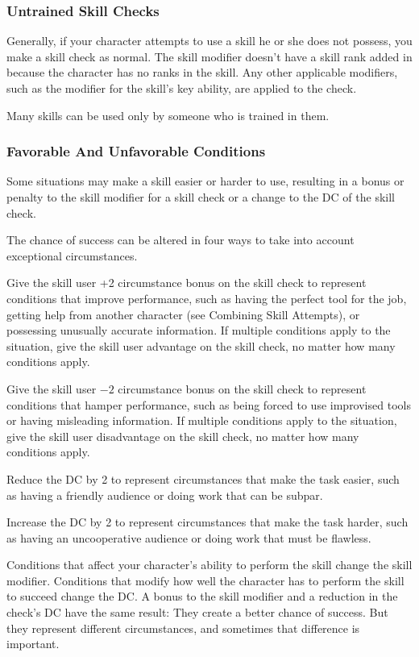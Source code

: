 \subsubsection{Untrained Skill Checks}
Generally, if your character attempts to use a skill he or she does not possess, you make a skill check as normal. The skill modifier doesn't have a skill rank added in because the character has no ranks in the skill. Any other applicable modifiers, such as the modifier for the skill's key ability, are applied to the check.

Many skills can be used only by someone who is trained in them.

\subsubsection{Favorable And Unfavorable Conditions}
Some situations may make a skill easier or harder to use, resulting in a bonus or penalty to the skill modifier for a skill check or a change to the DC of the skill check.

The chance of success can be altered in four ways to take into account exceptional circumstances.
\begin{enumerate*}
\item Give the skill user +2 circumstance bonus on the skill check to represent conditions that improve performance, such as having the perfect tool for the job, getting help from another character (see Combining Skill Attempts), or possessing unusually accurate information. If multiple conditions apply to the situation, give the skill user advantage on the skill check, no matter how many conditions apply.
\item Give the skill user $-2$ circumstance bonus on the skill check to represent conditions that hamper performance, such as being forced to use improvised tools or having misleading information. If multiple conditions apply to the situation, give the skill user disadvantage on the skill check, no matter how many conditions apply.
\item Reduce the DC by 2 to represent circumstances that make the task easier, such as having a friendly audience or doing work that can be subpar.
\item Increase the DC by 2 to represent circumstances that make the task harder, such as having an uncooperative audience or doing work that must be flawless.
\end{enumerate*}
Conditions that affect your character's ability to perform the skill change the skill modifier. Conditions that modify how well the character has to perform the skill to succeed change the DC. A bonus to the skill modifier and a reduction in the check's DC have the same result: They create a better chance of success. But they represent different circumstances, and sometimes that difference is important.

